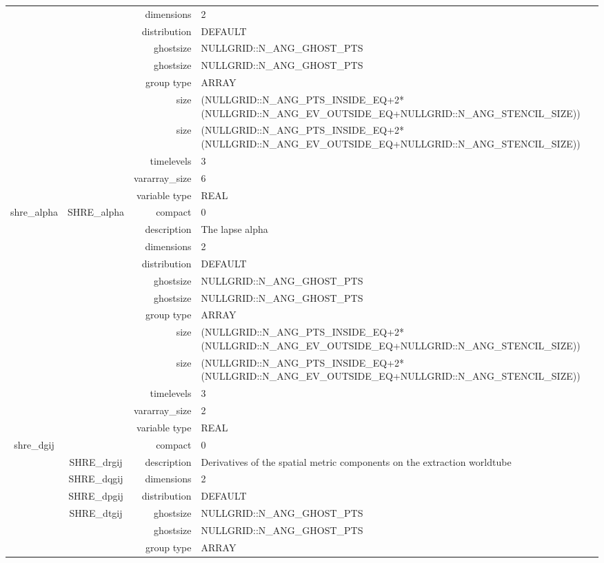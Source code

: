 \begin{tabular*}{150mm}{|c|c@{\extracolsep{\fill}}|rl|}
 &  & dimensions & 2 \\ 
 &  & distribution & DEFAULT \\ 
 &  & ghostsize & NULLGRID::N\_ANG\_GHOST\_PTS \\ 
& ~ & ghostsize & NULLGRID::N\_ANG\_GHOST\_PTS \\ 
 &  & group type & ARRAY \\ 
 &  & size & (NULLGRID::N\_ANG\_PTS\_INSIDE\_EQ+2*(NULLGRID::N\_ANG\_EV\_OUTSIDE\_EQ+NULLGRID::N\_ANG\_STENCIL\_SIZE)) \\ 
& ~ & size & (NULLGRID::N\_ANG\_PTS\_INSIDE\_EQ+2*(NULLGRID::N\_ANG\_EV\_OUTSIDE\_EQ+NULLGRID::N\_ANG\_STENCIL\_SIZE)) \\ 
 &  & timelevels & 3 \\ 
 &  & vararray\_size & 6 \\ 
 &  & variable type & REAL \\ 
\hline 
shre\_alpha & SHRE\_alpha & compact & 0 \\ 
 &  & description & The lapse alpha \\ 
 &  & dimensions & 2 \\ 
 &  & distribution & DEFAULT \\ 
 &  & ghostsize & NULLGRID::N\_ANG\_GHOST\_PTS \\ 
& ~ & ghostsize & NULLGRID::N\_ANG\_GHOST\_PTS \\ 
 &  & group type & ARRAY \\ 
 &  & size & (NULLGRID::N\_ANG\_PTS\_INSIDE\_EQ+2*(NULLGRID::N\_ANG\_EV\_OUTSIDE\_EQ+NULLGRID::N\_ANG\_STENCIL\_SIZE)) \\ 
& ~ & size & (NULLGRID::N\_ANG\_PTS\_INSIDE\_EQ+2*(NULLGRID::N\_ANG\_EV\_OUTSIDE\_EQ+NULLGRID::N\_ANG\_STENCIL\_SIZE)) \\ 
 &  & timelevels & 3 \\ 
 &  & vararray\_size & 2 \\ 
 &  & variable type & REAL \\ 
\hline 
shre\_dgij &  & compact & 0 \\ 
 & SHRE\_drgij & description & Derivatives of the spatial metric components on the extraction worldtube \\ 
 & SHRE\_dqgij & dimensions & 2 \\ 
 & SHRE\_dpgij & distribution & DEFAULT \\ 
 & SHRE\_dtgij & ghostsize & NULLGRID::N\_ANG\_GHOST\_PTS \\ 
& ~ & ghostsize & NULLGRID::N\_ANG\_GHOST\_PTS \\ 
 &  & group type & ARRAY \\ 

\end{tabular*}
